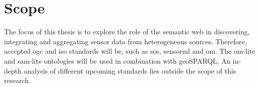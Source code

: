 \section{Scope}
The focus of this thesis is to explore the role of the semantic web in discovering, integrating and aggregating sensor data from heterogeneous sources. Therefore, accepted \ac{ogc} and \ac{iso} standards will be, such as \ac{sos}, \ac{sensorml} and \ac{om}. The om-lite and sam-lite ontologies will be used in combination with geoSPARQL. An in-depth analysis of different upcoming standards lies outside the scope of this research. 